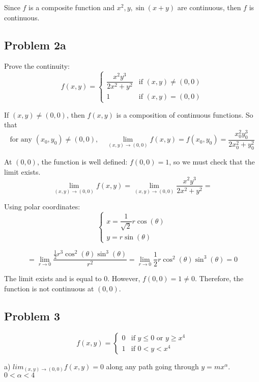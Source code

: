 \documentclass[11pt]{article}
\begin{document}
Since $f$ is a composite function and $x^2, y, \sin(x + y)$ are continuous, then $f$ is continuous.

\subsection*{Problem 2a}
Prove the continuity:
\[
f(x,y) = 
\begin{cases}
    \dfrac{x^2y^3}{2x^2 + y^2} & \text{if } (x,y) \neq (0,0) \\
    1 & \text{if } (x,y) = (0,0)
\end{cases}
\]

If $(x,y) \neq (0,0)$, then $f(x,y)$ is a composition of continuous functions. So that 
\[
\text{for any } (x_0,y_0) \neq (0,0), \quad \lim_{(x,y) \to (0,0)} f(x,y) = f(x_0,y_0) = \dfrac{x_0^2y_0^3}{2x_0^2 + y_0^2}
\]

At $(0,0)$, the function is well defined: $f(0,0) = 1$, so we must check that the limit exists.
\[
\lim_{(x,y) \to (0,0)} f(x,y) = \lim_{(x,y) \to (0,0)} \frac{x^2y^3}{2x^2 + y^2} = 
\]

Using polar coordinates:
\[
\begin{cases}
    x = \dfrac{1}{\sqrt{2}}r \cos(\theta) \\
    y = r \sin(\theta)
\end{cases}
\]

\[
= \lim_{r \to 0} \dfrac{\frac{1}{2} r^3 \cos^2(\theta) \sin^3(\theta)}{r^2} = \lim_{r \to 0} \frac{1}{2} r \cos^2(\theta) \sin^3(\theta) = 0
\]

The limit exists and is equal to 0. However, $f(0,0) = 1 \neq 0$. Therefore, the function is not continuous at $(0,0)$.

\subsection*{Problem 3}
\[
f(x,y) = 
\begin{cases}
    0 & \text{if } y \leq 0 \text{ or } y \geq x^4 \\
    1 & \text{if } 0 < y < x^4
\end{cases}
\]

a) $lim_{(x,y) \to (0,0)} f(x,y) = 0$ along any path going through $y = mx^\alpha$. \quad $0 < \alpha < 4$
\end{document}
